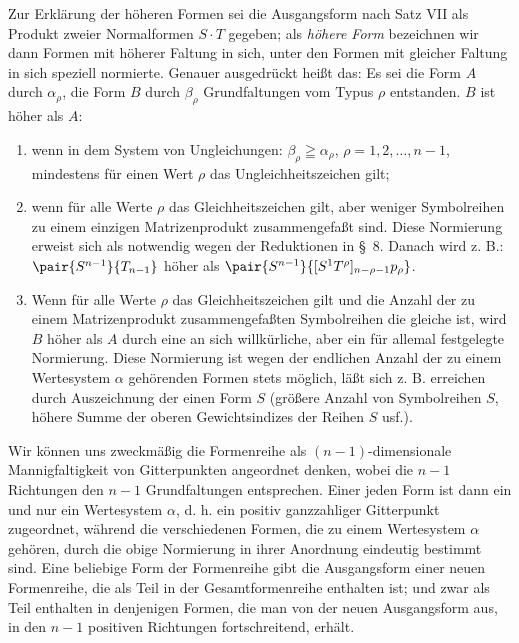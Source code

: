 Zur Erkl\"arung der h\"oheren Formen sei die Ausgangsform nach Satz VII als Produkt zweier Normalformen $S\cdot T$ gegeben; als \emph{h\"ohere Form} bezeichnen wir dann Formen mit h\"oherer Faltung in sich, unter den Formen mit gleicher Faltung in sich speziell normierte. Genauer ausgedr\"uckt hei\ss t das: Es sei die Form $A$ durch $\alpha_\rho$, die Form $B$ durch $\beta_\rho$ Grundfaltungen vom Typus $\rho$ entstanden. $B$ ist h\"oher als $A$:
\begin{enumerate}
\renewcommand{\labelenumi}{\arabic{enumi})}
\item wenn in dem System von Ungleichungen: $\beta_\rho\geqq\alpha_\rho$, $\rho=1,2,\ldots,n-1$, mindestens f\"ur einen Wert $\rho$ das Ungleichheitszeichen gilt;
\item wenn f\"ur alle Werte $\rho$ das Gleichheitszeichen gilt, aber weniger Symbolreihen zu einem einzigen Matrizenprodukt zusammengefa\ss t sind. Diese Normierung erweist sich als notwendig wegen der Reduktionen in \S\ 8. Danach wird z. B.: $\pair{S^{n-1}}{T_{n-1}}$ h\"oher als $\pair{S^{n-1}}{[S^1T^\rho]_{n-\rho-1}p_\rho}$.
\item Wenn f\"ur alle Werte $\rho$ das Gleichheitszeichen gilt und die Anzahl der zu einem Matrizenprodukt zusammengefa\ss ten Symbolreihen die gleiche ist, wird $B$ h\"oher als $A$ durch eine an sich willk\"urliche, aber ein f\"ur allemal festgelegte Normierung. Diese Normierung ist wegen der endlichen Anzahl der zu einem Wertesystem $\alpha$ geh\"orenden Formen stets m\"oglich, l\"a\ss t sich z. B. erreichen durch Auszeichnung der einen Form $S$ (gr\"o\ss ere Anzahl von Symbolreihen $S$, h\"ohere Summe der oberen Gewichtsindizes der Reihen $S$ usf.).
\end{enumerate}
Wir k\"onnen uns zweckm\"a\ss ig die Formenreihe als $(n-1)$-dimensionale Mannigfaltigkeit von Gitterpunkten angeordnet denken, wobei die $n-1$ Richtungen den $n-1$ Grundfaltungen entsprechen. Einer jeden Form ist dann ein und nur ein Wertesystem $\alpha$, d. h. ein positiv ganzzahliger Gitterpunkt zugeordnet, w\"ahrend die verschiedenen Formen, die zu einem Wertesystem $\alpha$ geh\"oren, durch die obige Normierung in ihrer Anordnung eindeutig bestimmt sind. Eine beliebige Form der Formenreihe gibt die Ausgangsform einer neuen Formenreihe, die als Teil in der Gesamtformenreihe enthalten ist; und zwar als Teil enthalten in denjenigen Formen, die man von der neuen Ausgangsform aus, in den $n-1$ positiven Richtungen fortschreitend, erh\"alt.

